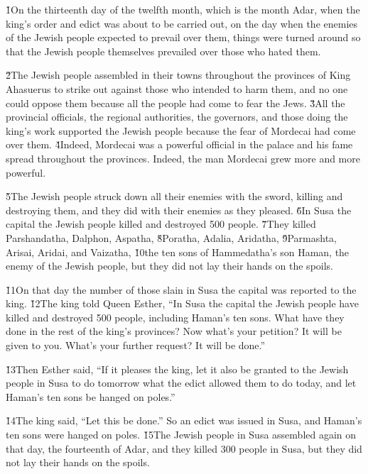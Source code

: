 \v{1}On the thirteenth day of the twelfth month, which is the month Adar, when the king's order and edict was about to be carried out, on the day when the enemies of the Jewish people expected to prevail over them, things were turned around so that the Jewish people themselves prevailed over those who hated them.

\v{2}The Jewish people assembled in their towns throughout the provinces of King Ahasuerus to strike out against those who intended to harm them, and no one could oppose them because all the people had come to fear the Jews. \v{3}All the provincial officials, the regional authorities, the governors, and those doing the king's work supported the Jewish people because the fear of Mordecai had come over them. \v{4}Indeed, Mordecai was a powerful official in the palace and his fame spread throughout the provinces. Indeed, the man Mordecai grew more and more powerful.

\v{5}The Jewish people struck down all their enemies with the sword, killing and destroying them, and they did with their enemies as they pleased. \v{6}In Susa the capital the Jewish people killed and destroyed 500 people. \v{7}They killed Parshandatha, Dalphon, Aspatha, \v{8}Poratha, Adalia, Aridatha, \v{9}Parmashta, Arisai, Aridai, and Vaizatha, \v{10}the ten sons of Hammedatha's son Haman, the enemy of the Jewish people, but they did not lay their hands on the spoils.

\v{11}On that day the number of those slain in Susa the capital was reported to the king. \v{12}The king told Queen Esther, ``In Susa the capital the Jewish people have killed and destroyed 500 people, including Haman's ten sons. What have they done in the rest of the king's provinces? Now what's your petition? It will be given to you. What's your further request? It will be done.''

\v{13}Then Esther said, ``If it pleases the king, let it also be granted to the Jewish people in Susa to do tomorrow what the edict allowed them to do today, and let Haman's ten sons be hanged on poles.''

\v{14}The king said, ``Let this be done.'' So an edict was issued in Susa, and Haman's ten sons were hanged on poles. \v{15}The Jewish people in Susa assembled again on that day, the fourteenth of Adar, and they killed 300 people in Susa, but they did not lay their hands on the spoils.

